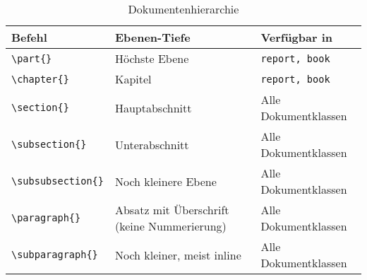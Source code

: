 \begin{table}[H]
    \centering
    \begin{tabular}{lp{7cm}l}
        \toprule
        \textbf{Befehl}                           & \textbf{Ebenen-Tiefe}                       & \textbf{Verfügbar in} \\
        \midrule
        \texttt{\textbackslash part\{\}}          & Höchste Ebene                               & \texttt{report, book} \\
        \texttt{\textbackslash chapter\{\}}       & Kapitel                                     & \texttt{report, book} \\
        \texttt{\textbackslash section\{\}}       & Hauptabschnitt                              & Alle Dokumentklassen  \\
        \texttt{\textbackslash subsection\{\}}    & Unterabschnitt                              & Alle Dokumentklassen  \\
        \texttt{\textbackslash subsubsection\{\}} & Noch kleinere Ebene                         & Alle Dokumentklassen  \\
        \texttt{\textbackslash paragraph\{\}}     & Absatz mit Überschrift (keine Nummerierung) & Alle Dokumentklassen  \\
        \texttt{\textbackslash subparagraph\{\}}  & Noch kleiner, meist inline                  & Alle Dokumentklassen  \\
        \bottomrule
    \end{tabular}
    \caption{Dokumentenhierarchie}
    \label{tab:dokumenten_hierarchie}
\end{table}
